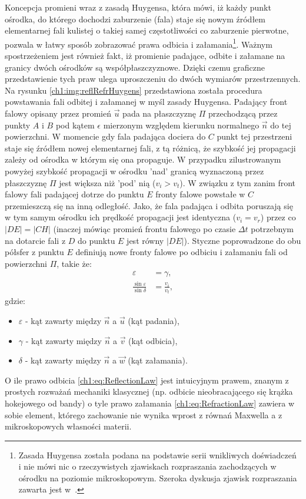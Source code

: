 Koncepcja promieni wraz z zasadą Huygensa, która mówi, iż każdy punkt ośrodka, do którego dochodzi zaburzenie (fala) staje się nowym źródłem elementarnej fali kulistej o takiej samej częstotliwości co zaburzenie pierwotne, pozwala w łatwy sposób zobrazować prawa odbicia i załamania\footnote{Zasada Huygensa została podana na podstawie serii wnikliwych doświadczeń i nie mówi nic o rzeczywistych zjawiskach rozpraszania zachodzących w ośrodku na poziomie mikroskopowym. Szeroka dyskusja zjawisk rozpraszania zawarta jest w~\cite{Hecht}. }. Ważnym spostrzeżeniem jest również fakt, iż promienie padające, odbite i załamane na granicy dwóch ośrodków są współpłaszczyznowe. Dzięki czemu graficzne przedstawienie tych praw ulega uproszczeniu do dwóch wymiarów przestrzennych.
Na rysunku \ref{ch1:img:reflRefrHuygens} przedstawiona została procedura powstawania fali odbitej i załamanej w myśl zasady Huygensa. Padający front falowy opisany przez promień $\vec{u}$ pada na płaszczyznę $\Pi$ przechodzącą przez punkty $A$ i $B$ pod kątem $\epsilon$ mierzonym względem kierunku normalnego $\vec{n}$ do tej powierzchni. W momencie gdy fala padająca dociera do $C$ punkt tej przestrzeni staje się źródłem nowej elementarnej fali, z tą różnicą, że szybkość jej propagacji zależy od ośrodka w którym się ona propaguje. W przypadku zilustrowanym powyżej szybkość propagacji w ośrodku 'nad' granicą wyznaczoną przez płaszczyznę $\Pi$ jest większa niż 'pod' nią ($v_i > v_t$). W związku z tym zanim front falowy fali padającej dotrze do punktu $E$ fronty falowe powstałe w $C$ przemieszczą się na inną odległość. Jako, że fala padająca i odbita poruszają się w tym samym ośrodku ich prędkość propagacji jest identyczna ($v_i = v_r$) przez co $|DE| = |CH|$ (inaczej mówiąc promień frontu falowego po czasie $\Delta t$ potrzebnym na dotarcie fali z $D$ do punktu $E$ jest równy $|DE|$). Styczne poprowadzone do obu półsfer z punktu $E$ definiują nowe fronty falowe po odbiciu i załamaniu fali od powierzchni $\Pi$, takie że:
\begin{align}
\label{ch1:eq:ReflectionLaw}
\varepsilon &= \gamma,\\
\label{ch1:eq:RefractionLaw}
\frac{\sin\varepsilon}{\sin\delta} &= \frac{v_i}{v_t},
\end{align}
gdzie:
\begin{itemize}
\item[] $\varepsilon$ - kąt zawarty między $\vec{n}$ a $\vec{u}$ (kąt padania),
\item[] $\gamma$ - kąt zawarty między $\vec{n}$ a $\vec{v}$ (kąt odbicia),
\item[] $\delta$ - kąt zawarty między $\vec{n}$ a $\vec{w}$ (kąt załamania).
\end{itemize}
O ile prawo odbicia \eqref{ch1:eq:ReflectionLaw} jest intuicyjnym prawem, znanym z prostych rozważań mechaniki klasycznej (np. odbicie nieobracającego się krążka hokejowego od bandy) o tyle prawo załamania \eqref{ch1:eq:RefractionLaw} zawiera w sobie element, którego zachowanie nie wynika wprost z równań Maxwella a z mikroskopowych własności materii. 

